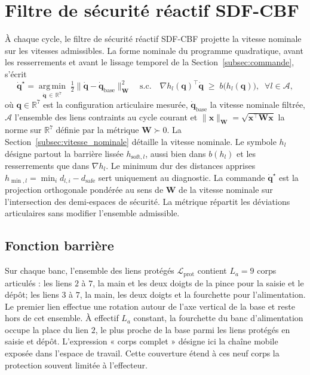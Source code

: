 \section{Filtre de sécurité réactif \acs{SDF}-\acs{CBF}}\label{sec:sdfcbf}
À chaque cycle, le filtre de sécurité réactif \acs{SDF}-\acs{CBF} projette la vitesse nominale sur les vitesses admissibles. La forme nominale du programme quadratique, avant les resserrements et avant le lissage temporel de la Section~\ref{subsec:commande}, s'écrit
\begin{equation}\label{eq:cbf_qp}
\dot{\mathbf{q}}^{\star} = \operatorname*{arg\,min}_{\dot{\mathbf{q}}\,\in\,\mathbb{R}^7}\; \tfrac{1}{2}\big\|\dot{\mathbf{q}}-\dot{\mathbf{q}}_{\mathrm{base}}\big\|_{\mathbf{W}}^2
\quad \text{s.c.} \quad
\nabla h_l(\mathbf{q})^{\top}\dot{\mathbf{q}} \;\geq\; b\big(h_l(\mathbf{q})\big), \;\; \forall l \in \mathcal{A},
\end{equation}
où $\mathbf{q}\in\mathbb{R}^7$ est la configuration articulaire mesurée, $\dot{\mathbf{q}}_{\mathrm{base}}$ la vitesse nominale filtrée, $\mathcal{A}$ l'ensemble des liens contraints au cycle courant et $\|\mathbf{x}\|_{\mathbf{W}} = \sqrt{\mathbf{x}^\top \mathbf{W}\mathbf{x}}$ la norme sur $\mathbb{R}^7$ définie par la métrique $\mathbf{W}\succ 0$. La Section~\ref{subsec:vitesse_nominale} détaille la vitesse nominale. Le symbole $h_l$ désigne partout la barrière lissée $h_{\mathrm{soft},l}$, aussi bien dans $b(h_l)$ et les resserrements que dans $\nabla h_l$. Le minimum dur des distances apprises $h_{\min,l}=\min_i d_{l,i}-d_{\mathrm{safe}}$ sert uniquement au diagnostic. La commande $\dot{\mathbf{q}}^\star$ est la projection orthogonale pondérée au sens de $\mathbf{W}$ de la vitesse nominale sur l'intersection des demi-espaces de sécurité. La métrique répartit les déviations articulaires sans modifier l'ensemble admissible.

\subsection{Fonction barrière}\label{subsec:barriere}

Sur chaque banc, l'ensemble des liens protégés $\mathcal{L}_{\mathrm{prot}}$ contient $L_a=9$ corps articulés : les liens $2$ à $7$, la main et les deux doigts de la pince pour la saisie et le dépôt; les liens $3$ à $7$, la main, les deux doigts et la fourchette pour l'alimentation. Le premier lien effectue une rotation autour de l'axe vertical de la base et reste hors de cet ensemble. À effectif $L_a$ constant, la fourchette du banc d'alimentation occupe la place du lien $2$, le plus proche de la base parmi les liens protégés en saisie et dépôt. L'expression « corps complet » désigne ici la chaîne mobile exposée dans l'espace de travail. Cette couverture étend à ces neuf corps la protection souvent limitée à l'effecteur.

